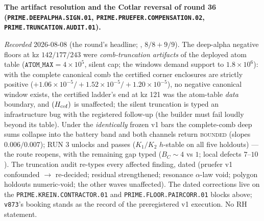 \documentclass[11pt,a4paper]{article}
\begin{document}
\par\smallskip\noindent\textbf{The artifact resolution and the
Cotlar reversal of round 36
(\texttt{PRIME.DEEPALPHA.SIGN.01},
\texttt{PRIME.PRUEFER.\allowbreak COMPENSATION.02},
\texttt{PRIME.TRUNCATION.\allowbreak AUDIT.01}).}
{\sloppy
\emph{Recorded} 2026-08-08 (the round's headline;
, $8/8 + 9/9$).  The
deep-alpha negative floors at kz $142/177/243$ were
\emph{comb-truncation artifacts} of the deployed atom table
($\texttt{ATOM\_MAX} = 4\times10^{5}$, silent cap;
the windows demand support to $1.8\times10^{6}$): with the
complete canonical comb the certified corner enclosures are
strictly positive
($+1.06\times10^{-5}/+1.52\times10^{-5}/+1.20\times10^{-5}$),
no negative canonical window exists, the certified ladder's end
at kz 121 was the atom-table \emph{data} boundary, and
$(H_{\rm cof})$ is unaffected; the silent truncation is typed
an infrastructure bug with the registered follow-up (the
builder must fail loudly beyond its table).  Under the
\emph{identically} frozen v1 bars the complete-comb deep sums
collapse into the battery band and both channels return
\textsc{bounded} (slopes $0.006/0.007$); RUN 3 unlocks and
passes ($K_1/K_2$ $h$-stable on all five holdouts) --- the
route reopens, with the remaining gap typed ($B_C \sim 4$ vs
$1$; local defects $7$--$10$).  The truncation audit re-types
every affected finding, dated (pruefer v1 confounded $\to$
re-decided; residual strengthened; resonance $\alpha$-law void;
polygon holdouts numeric-void; the other waves unaffected).
The dated corrections live on the
\texttt{PRIME.KREIN.CONTRACTOR.01} and
\texttt{PRIME.FLOOR.PAIRCORR.01} blocks above; \texttt{v873}'s
booking stands as the record of the preregistered v1
execution.  No RH statement.\par}
\end{document}
